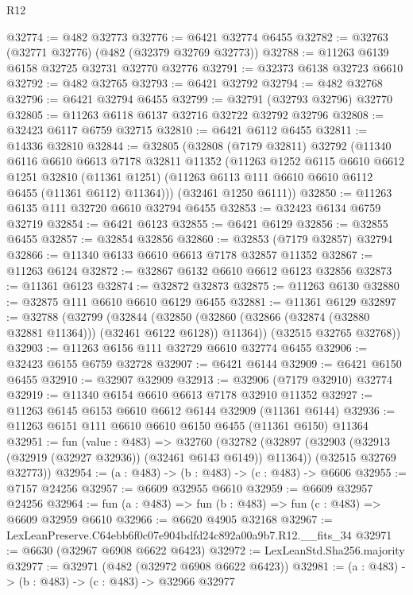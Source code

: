 \begin{lexlean}{R12}
\begin{coremodule}
@32774 := @482 @32773
@32776 := @6421 @32774 @6455
@32782 := @32763 (@32771 @32776) (@482 (@32379 @32769 @32773))
@32788 := @11263 @6139 @6158 @32725 @32731 @32770 @32776
@32791 := @32373 @6138 @32723 @6610
@32792 := @482 @32765
@32793 := @6421 @32792
@32794 := @482 @32768
@32796 := @6421 @32794 @6455
@32799 := @32791 (@32793 @32796) @32770
@32805 := @11263 @6118 @6137 @32716 @32722 @32792 @32796
@32808 := @32423 @6117 @6759 @32715
@32810 := @6421 @6112 @6455
@32811 := @14336 @32810
@32844 := @32805
    (@32808
      (@7179 @32811)
      @32792
      (@11340
        @6116
        @6610
        @6613
        @7178
        @32811
        @11352
        (@11263
          @1252
          @6115
          @6610
          @6612
          @1251
          @32810
          (@11361 @1251)
          (@11263 @6113 @111 @6610 @6610 @6112 @6455 (@11361 @6112) @11364)))
      (@32461 @1250 @6111))
@32850 := @11263 @6135 @111 @32720 @6610 @32794 @6455
@32853 := @32423 @6134 @6759 @32719
@32854 := @6421 @6123
@32855 := @6421 @6129
@32856 := @32855 @6455
@32857 := @32854 @32856
@32860 := @32853 (@7179 @32857) @32794
@32866 := @11340 @6133 @6610 @6613 @7178 @32857 @11352
@32867 := @11263 @6124
@32872 := @32867 @6132 @6610 @6612 @6123 @32856
@32873 := @11361 @6123
@32874 := @32872 @32873
@32875 := @11263 @6130
@32880 := @32875 @111 @6610 @6610 @6129 @6455
@32881 := @11361 @6129
@32897 := @32788
    (@32799
      (@32844
        (@32850 (@32860 (@32866 (@32874 (@32880 @32881 @11364))) (@32461 @6122 @6128)) @11364))
      (@32515 @32765 @32768))
@32903 := @11263 @6156 @111 @32729 @6610 @32774 @6455
@32906 := @32423 @6155 @6759 @32728
@32907 := @6421 @6144
@32909 := @6421 @6150 @6455
@32910 := @32907 @32909
@32913 := @32906 (@7179 @32910) @32774
@32919 := @11340 @6154 @6610 @6613 @7178 @32910 @11352
@32927 := @11263 @6145 @6153 @6610 @6612 @6144 @32909 (@11361 @6144)
@32936 := @11263 @6151 @111 @6610 @6610 @6150 @6455 (@11361 @6150) @11364
@32951 := fun (value : @483) =>
  @32760
    (@32782
      (@32897 (@32903 (@32913 (@32919 (@32927 @32936)) (@32461 @6143 @6149)) @11364))
      (@32515 @32769 @32773))
@32954 := (a : @483) -> (b : @483) -> (c : @483) -> @6606
@32955 := @7157 @24256
@32957 := @6609 @32955 @6610
@32959 := @6609 @32957 @24256
@32964 := fun (a : @483) => fun (b : @483) => fun (c : @483) => @6609 @32959 @6610
@32966 := @6620 @4905 @32168
@32967 := LexLeanPreserve.C64ebb6f0c07e904bdfd24c892a00a9b7.R12.__fits_34
@32971 := @6630 (@32967 @6908 @6622 @6423)
@32972 := LexLeanStd.Sha256.majority
@32977 := @32971 (@482 (@32972 @6908 @6622 @6423))
@32981 := (a : @483) -> (b : @483) -> (c : @483) -> @32966 @32977

\end{coremodule}
\end{lexlean}
